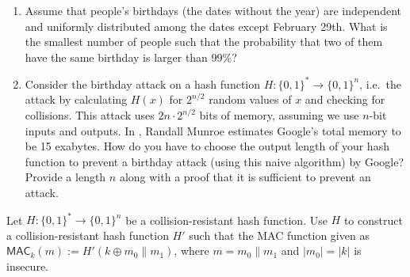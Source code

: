\documentclass[a4paper,10pt,landscape,twocolumn]{scrartcl}
\begin{document}
\begin{exercise}
\begin{enumerate}
	\item Assume that people's birthdays (the dates without the year) are independent and uniformly distributed among the dates except February 29th. What is the smallest number of people such that the probability that two of them have the same birthday is larger than 99\%?
	\item Consider the birthday attack on a hash function $H:
          \{0,1\}^*\to\{0,1\}^n$, i.e.\ the attack by calculating
          $H(x)$ for $2^{n/2}$ random values of $x$ and checking for
          collisions. This attack uses $2n \cdot 2^{n/2}$ bits of
          memory, assuming we use $n$-bit inputs and outputs. In
          , Randall Munroe
          estimates Google's total memory to be 15 exabytes.  How do
          you have to choose the output length of your hash function
          to prevent a birthday attack (using this naive algorithm) by Google? Provide a length $n$ along with a proof that it is sufficient to prevent an attack.
\end{enumerate}
\end{exercise}



\begin{exercise}[HMAC?]
  Let $H: \{0,1\}^*\to \{0,1\}^n$ be a collision-resistant hash function. Use $H$ to construct a collision-resistant hash function $H'$ such that the MAC function given as $\mathsf{MAC}_k(m) := H'(k\oplus m_0\|m_1)$, where $m=m_0\|m_1$ and $|m_0|=|k|$ is insecure.
\end{exercise}
\end{document}
